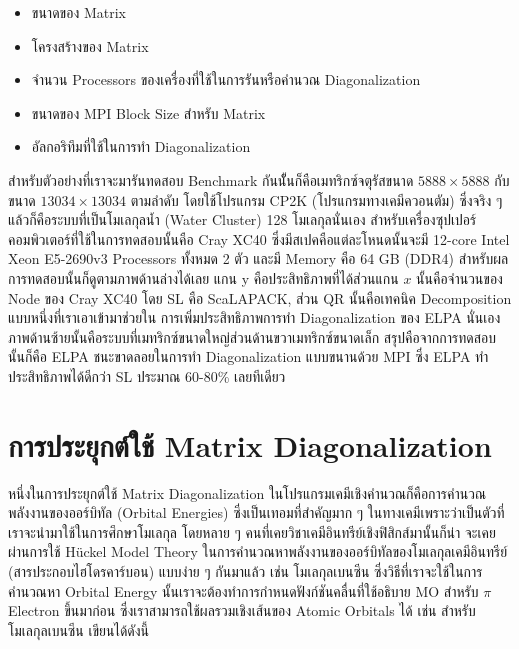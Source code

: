 \begin{itemize}[topsep=0pt,noitemsep]
  \setlength\itemsep{0.5em}
  \item ขนาดของ Matrix

  \item โครงสร้างของ Matrix

  \item จำนวน Processors ของเครื่องที่ใช้ในการรันหรือคำนวณ Diagonalization

  \item ขนาดของ MPI Block Size สำหรับ Matrix

  \item อัลกอริทึมที่ใช้ในการทำ Diagonalization
\end{itemize}

สำหรับตัวอย่างที่เราจะมารันทดสอบ Benchmark กันนัั้นก็คือเมทริกซ์จตุรัสขนาด $5888 \times 5888$ กับขนาด $13034 \times 13034$
ตามลำดับ โดยใช้โปรแกรม CP2K (โปรแกรมทางเคมีควอนตัม) ซึ่งจริง ๆ แล้วก็คือระบบที่เป็นโมเลกุลน้ำ (Water Cluster) 128 โมเลกุลนั่นเอง
สำหรับเครื่องซุปเปอร์คอมพิวเตอร์ที่ใช้ในการทดสอบนั้นคือ Cray XC40 ซึ่งมีสเปคคือแต่ละโหนดนั้นจะมี 12-core Intel Xeon E5-2690v3 Processors
ทั้งหมด 2 ตัว และมี Memory คือ 64 GB (DDR4) สำหรับผลการทดสอบนั้นก็ดูตามภาพด้านล่างได้เลย แกน y คือประสิทธิภาพที่ได้ส่วนแกน $x$
นั้นคือจำนวนของ Node ของ Cray XC40 โดย SL คือ ScaLAPACK, ส่วน QR นั้นคือเทคนิค Decomposition แบบหนึ่งที่เราเอาเข้ามาช่วยใน%
การเพิ่มประสิทธิภาพการทำ Diagonalization ของ ELPA นั่นเอง ภาพด้านซ้ายนั้นคือระบบที่เมทริกซ์ขนาดใหญ่ส่วนด้านขวาเมทริกซ์ขนาดเล็ก
สรุปคือจากการทดสอบนั้นก็คือ ELPA ชนะขาดลอยในการทำ Diagonalization แบบขนานด้วย MPI ซึ่ง ELPA ทำประสิทธิภาพได้ดีกว่า SL
ประมาณ 60-80\% เลยทีเดียว

\section{การประยุกต์ใช้ Matrix Diagonalization}

หนึ่งในการประยุกต์ใช้ Matrix Diagonalization ในโปรแกรมเคมีเชิงคำนวณก็คือการคำนวณพลังงานของออร์บิทัล (Orbital Energies)
ซึ่งเป็นเทอมที่สำคัญมาก ๆ ในทางเคมีเพราะว่าเป็นตัวที่เราจะนำมาใช้ในการศึกษาโมเลกุล โดยหลาย ๆ คนที่เคยวิชาเคมีอินทรีย์เชิงฟิสิกส์มานั้นก็น่า%
จะเคยผ่านการใช้ H\"{u}ckel Model Theory ในการคำนวณหาพลังงานของออร์บิทัลของโมเลกุลเคมีอินทรีย์ (สารประกอบไฮโดรคาร์บอน) แบบง่าย ๆ
กันมาแล้ว เช่น โมเลกุลเบนซีน ซึ่งวิธีที่เราจะใช้ในการคำนวณหา Orbital Energy นั้นเราจะต้องทำการกำหนดฟังก์ชันคลื่นที่ใช้อธิบาย MO สำหรับ
$\pi$ Electron ขึ้นมาก่อน ซึ่งเราสามารถใช้ผลรวมเชิงเส้นของ Atomic Orbitals ได้ เช่น สำหรับโมเลกุลเบนซีน เขียนได้ดังนี้

